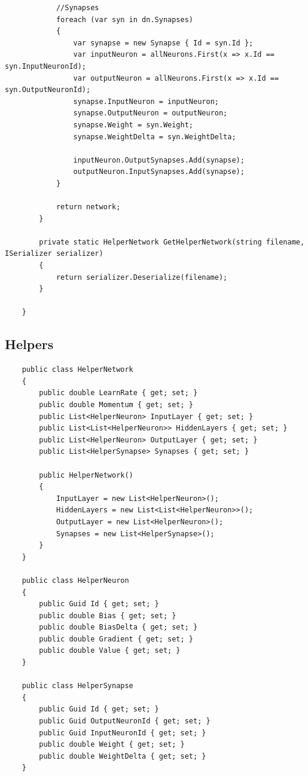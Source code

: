 \documentclass[12pt,a4paper]{article}
\begin{document}
\begin{lstlisting}
            //Synapses
            foreach (var syn in dn.Synapses)
            {
                var synapse = new Synapse { Id = syn.Id };
                var inputNeuron = allNeurons.First(x => x.Id == syn.InputNeuronId);
                var outputNeuron = allNeurons.First(x => x.Id == syn.OutputNeuronId);
                synapse.InputNeuron = inputNeuron;
                synapse.OutputNeuron = outputNeuron;
                synapse.Weight = syn.Weight;
                synapse.WeightDelta = syn.WeightDelta;

                inputNeuron.OutputSynapses.Add(synapse);
                outputNeuron.InputSynapses.Add(synapse);
            }

            return network;
        }

        private static HelperNetwork GetHelperNetwork(string filename, ISerializer serializer)
        {
            return serializer.Deserialize(filename);
        }

    }
	\end{lstlisting}
	
	\subsection{Helpers}
	\begin{lstlisting}
	public class HelperNetwork
	{
		public double LearnRate { get; set; }
		public double Momentum { get; set; }
		public List<HelperNeuron> InputLayer { get; set; }
		public List<List<HelperNeuron>> HiddenLayers { get; set; }
		public List<HelperNeuron> OutputLayer { get; set; }
		public List<HelperSynapse> Synapses { get; set; }

		public HelperNetwork()
		{
			InputLayer = new List<HelperNeuron>();
			HiddenLayers = new List<List<HelperNeuron>>();
			OutputLayer = new List<HelperNeuron>();
			Synapses = new List<HelperSynapse>();
		}
	}

	public class HelperNeuron
	{
		public Guid Id { get; set; }
		public double Bias { get; set; }
		public double BiasDelta { get; set; }
		public double Gradient { get; set; }
		public double Value { get; set; }
	}

	public class HelperSynapse
	{
		public Guid Id { get; set; }
		public Guid OutputNeuronId { get; set; }
		public Guid InputNeuronId { get; set; }
		public double Weight { get; set; }
		public double WeightDelta { get; set; }
	}
	\end{lstlisting}
	
\end{document}
